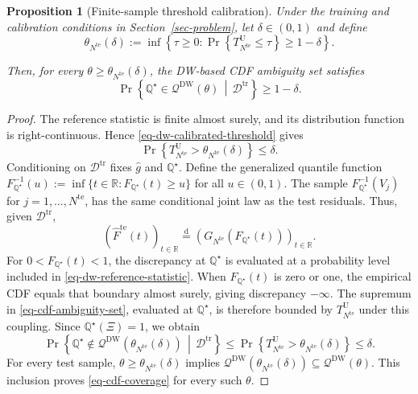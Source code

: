 \documentclass[review,11pt,3p,authoryear,nopreprintline]{elsarticle}
\newtheorem{proposition}{Proposition}
\begin{document}
\begin{proposition}[Finite-sample threshold calibration]
  \label{proposition-01}
  Under the training and calibration conditions in Section~\ref{sec-problem}, let $\delta\in(0,1)$ and define
  \begin{equation}
    \theta_{N^{\mathrm{te}}}(\delta):=\inf\left\{\tau\ge0:\Pr\left\{T_{N^{\mathrm{te}}}^{\mathrm U}\le\tau\right\}\ge1-\delta\right\}.
    \label{eq-dw-calibrated-threshold}
  \end{equation}

  Then, for every $\theta\ge\theta_{N^{\mathrm{te}}}(\delta)$, the DW-based CDF ambiguity set satisfies
  \begin{equation}
    \Pr\left\{\mathbb Q^\star\in\mathcal Q^{\mathrm{DW}}(\theta)\,\middle|\,\mathcal D^{\mathrm{tr}}\right\}\ge1-\delta.
    \label{eq-cdf-coverage}
  \end{equation}
\end{proposition}
\begin{proof}
  The reference statistic is finite almost surely, and its distribution function is right-continuous. Hence \eqref{eq-dw-calibrated-threshold} gives
  \[
    \Pr\left\{T_{N^{\mathrm{te}}}^{\mathrm U}>\theta_{N^{\mathrm{te}}}(\delta)\right\}\le\delta.
  \]
  Conditioning on $\mathcal D^{\mathrm{tr}}$ fixes $\hat g$ and $\mathbb Q^\star$. Define the generalized quantile function $F_{\mathbb Q^\star}^{-1}(u):=\inf\{t\in\mathbb R:F_{\mathbb Q^\star}(t)\ge u\}$ for all $u\in(0,1)$. The sample $F_{\mathbb Q^\star}^{-1}(V_j)$ for $j=1,\ldots,N^{\mathrm{te}}$, has the same conditional joint law as the test residuals. Thus, given $\mathcal D^{\mathrm{tr}}$,
  \[
    \left(\widehat F^{\mathrm{te}}(t)\right)_{t\in\mathbb R}\overset{\mathrm d}{=}\left(G_{N^{\mathrm{te}}}\!\left(F_{\mathbb Q^\star}(t)\right)\right)_{t\in\mathbb R}.
  \]
  For $0<F_{\mathbb Q^\star}(t)<1$, the discrepancy at $\mathbb Q^\star$ is evaluated at a probability level included in \eqref{eq-dw-reference-statistic}. When $F_{\mathbb Q^\star}(t)$ is zero or one, the empirical CDF equals that boundary almost surely, giving discrepancy $-\infty$. The supremum in \eqref{eq-cdf-ambiguity-set}, evaluated at $\mathbb Q^\star$, is therefore bounded by $T_{N^{\mathrm{te}}}^{\mathrm U}$ under this coupling. Since $\mathbb Q^\star(\Xi)=1$, we obtain
  \[
    \Pr\left\{\mathbb Q^\star\notin\mathcal Q^{\mathrm{DW}}\!\left(\theta_{N^{\mathrm{te}}}(\delta)\right)\,\middle|\,\mathcal D^{\mathrm{tr}}\right\}
    \le\Pr\left\{T_{N^{\mathrm{te}}}^{\mathrm U}>\theta_{N^{\mathrm{te}}}(\delta)\right\}\le\delta.
  \]
  For every test sample, $\theta\ge\theta_{N^{\mathrm{te}}}(\delta)$ implies $\mathcal Q^{\mathrm{DW}}\!\left(\theta_{N^{\mathrm{te}}}(\delta)\right)\subseteq\mathcal Q^{\mathrm{DW}}(\theta)$. This inclusion proves \eqref{eq-cdf-coverage} for every such $\theta$.
\end{proof}
\end{document}
